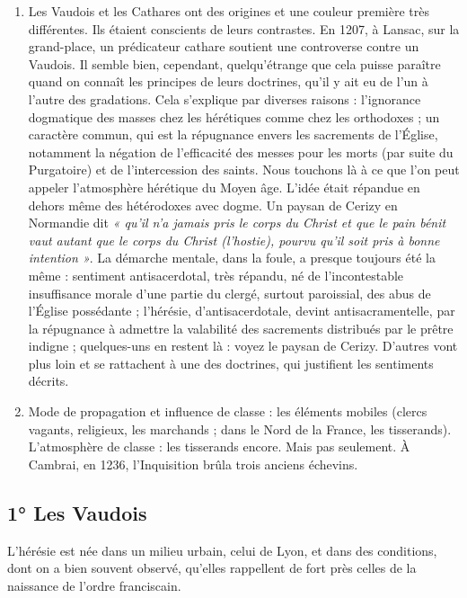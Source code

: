 \documentclass[french,twoside]{book} %
\begin{document}
\begin{enumerate}[itemsep=\baselineskip,]
\item Les Vaudois et les Cathares ont des origines et une couleur première très différentes. Ils étaient conscients de leurs contrastes. En 1207, à Lansac, sur la grand-place, un prédicateur cathare soutient une controverse contre un Vaudois. Il semble bien, cependant, quelqu’étrange que cela puisse paraître quand on connaît les principes de leurs doctrines, qu’il y ait eu de l’un à l’autre des gradations. Cela s’explique par diverses raisons : l’ignorance dogmatique des masses chez les hérétiques comme chez les orthodoxes ; un caractère commun, qui est la répugnance envers les sacrements de l’Église, notamment la négation de l’efficacité des messes pour les morts (par suite du Purgatoire) et de l’intercession des saints. Nous touchons là à ce que l’on peut appeler l’atmosphère hérétique du Moyen âge. L’idée était répandue en dehors même des hétérodoxes avec dogme. Un paysan de Cerizy en Normandie dit \emph{« qu’il n’a jamais pris le corps du Christ et que le pain bénit vaut autant que le corps  
\label{p103} du Christ (l’hostie), pourvu qu’il soit pris à bonne intention »}. La démarche mentale, dans la foule, a presque toujours été la même : sentiment antisacerdotal, très répandu, né de l’incontestable insuffisance morale d’une partie du clergé, surtout paroissial, des abus de l’Église possédante ; l’hérésie, d’antisacerdotale, devint antisacramentelle, par la répugnance à admettre la valabilité des sacrements distribués par le prêtre indigne ; quelques-uns en restent là : voyez le paysan de Cerizy. D’autres vont plus loin et se rattachent à une des doctrines, qui justifient les sentiments décrits.
\item Mode de propagation et influence de classe : les éléments mobiles (clercs vagants, religieux, les marchands ; dans le Nord de la France, les tisserands). L’atmosphère de classe : les tisserands encore. Mais pas seulement. À Cambrai, en 1236, l’Inquisition brûla trois anciens échevins.

\end{enumerate}\subsection[1° Les Vaudois]{1° Les Vaudois}
\noindent L’hérésie est née dans un milieu urbain, celui de Lyon, et dans des conditions, dont on a bien souvent observé, qu’elles rappellent de fort près celles de la naissance de l’ordre franciscain.\par
\end{document}
